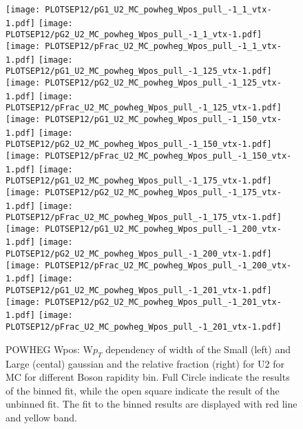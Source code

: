 \documentclass[41pt,a4paper,oneside]{report}
\begin{document}
\begin{figure}[h!]
  \begin{center}
    \texttt{[image: PLOTSEP12/pG1\_U2\_MC\_powheg\_Wpos\_pull\_-1\_1\_vtx-1.pdf]}
    \texttt{[image: PLOTSEP12/pG2\_U2\_MC\_powheg\_Wpos\_pull\_-1\_1\_vtx-1.pdf]}
    \texttt{[image: PLOTSEP12/pFrac\_U2\_MC\_powheg\_Wpos\_pull\_-1\_1\_vtx-1.pdf]} 
    \texttt{[image: PLOTSEP12/pG1\_U2\_MC\_powheg\_Wpos\_pull\_-1\_125\_vtx-1.pdf]}
    \texttt{[image: PLOTSEP12/pG2\_U2\_MC\_powheg\_Wpos\_pull\_-1\_125\_vtx-1.pdf]}
    \texttt{[image: PLOTSEP12/pFrac\_U2\_MC\_powheg\_Wpos\_pull\_-1\_125\_vtx-1.pdf]} 
    \texttt{[image: PLOTSEP12/pG1\_U2\_MC\_powheg\_Wpos\_pull\_-1\_150\_vtx-1.pdf]}
    \texttt{[image: PLOTSEP12/pG2\_U2\_MC\_powheg\_Wpos\_pull\_-1\_150\_vtx-1.pdf]}
    \texttt{[image: PLOTSEP12/pFrac\_U2\_MC\_powheg\_Wpos\_pull\_-1\_150\_vtx-1.pdf]} 
    \texttt{[image: PLOTSEP12/pG1\_U2\_MC\_powheg\_Wpos\_pull\_-1\_175\_vtx-1.pdf]}
    \texttt{[image: PLOTSEP12/pG2\_U2\_MC\_powheg\_Wpos\_pull\_-1\_175\_vtx-1.pdf]}
    \texttt{[image: PLOTSEP12/pFrac\_U2\_MC\_powheg\_Wpos\_pull\_-1\_175\_vtx-1.pdf]} 
    \texttt{[image: PLOTSEP12/pG1\_U2\_MC\_powheg\_Wpos\_pull\_-1\_200\_vtx-1.pdf]}
    \texttt{[image: PLOTSEP12/pG2\_U2\_MC\_powheg\_Wpos\_pull\_-1\_200\_vtx-1.pdf]}
    \texttt{[image: PLOTSEP12/pFrac\_U2\_MC\_powheg\_Wpos\_pull\_-1\_200\_vtx-1.pdf]} 
    \texttt{[image: PLOTSEP12/pG1\_U2\_MC\_powheg\_Wpos\_pull\_-1\_201\_vtx-1.pdf]}
    \texttt{[image: PLOTSEP12/pG2\_U2\_MC\_powheg\_Wpos\_pull\_-1\_201\_vtx-1.pdf]}
    \texttt{[image: PLOTSEP12/pFrac\_U2\_MC\_powheg\_Wpos\_pull\_-1\_201\_vtx-1.pdf]} 
    \caption{POWHEG Wpos: W$p_{T}$ dependency of width of the Small (left) and Large (cental) gaussian and the relative fraction (right) for U2 for MC for different Boson rapidity bin. Full Circle indicate the results of the binned fit, while the open square indicate the result of the unbinned fit. The fit to the binned results are displayed with red line and yellow band.
\newline
}
    \label{fig:SmallLargeU2POWpos}
  \end{center}
\end{figure}


\end{document}
